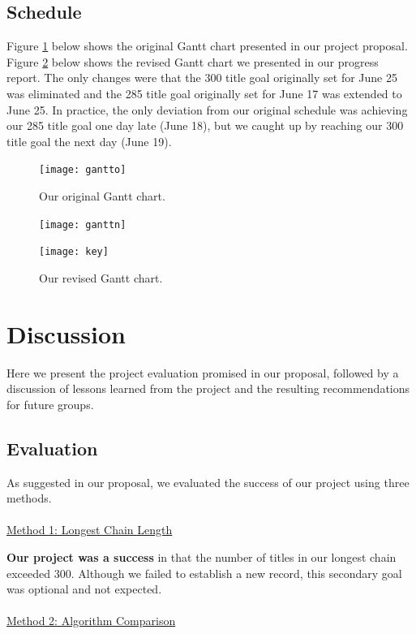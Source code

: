 \documentclass[11pt,english]{article}
\begin{document}
\subsection{Schedule}
Figure \ref{fig:gantto} below shows the original Gantt chart presented in
our project proposal. Figure \ref{fig:ganttn} below shows the revised Gantt
chart we presented in our progress report. The only changes were that the 300
title goal originally set for June 25 was eliminated and the 285 title goal
originally set for June 17 was extended to June 25. In practice, the only
deviation from our original schedule was achieving our 285 title goal one day
late (June 18), but we caught up by reaching our 300 title goal the next day
(June 19).
\begin{figure}[h]
\begin{center}
\texttt{[image: gantto]}
\end{center}
\vspace{-7mm}
\caption{Our original Gantt chart.}
\label{fig:gantto}
\end{figure}
\begin{figure}[h]
\begin{center}
\texttt{[image: ganttn]}
\end{center}
\vspace{-7mm}
\caption{Our revised Gantt chart.}
\label{fig:ganttn}
\texttt{[image: key]}
\end{figure}

\section{Discussion}
Here we present the project evaluation promised in our proposal, followed by
a discussion of lessons learned from the project and the resulting
recommendations for future groups.
\subsection{Evaluation}
As suggested in our proposal, we evaluated the success of our project using
three methods.\\\\
\underline{Method 1: Longest Chain Length}


{\bf Our project was a success} in that the number of titles in our longest
chain exceeded 300. Although we failed to establish a new record, this
secondary goal was optional and not expected.\\\\
\underline{Method 2: Algorithm Comparison}
\end{document}
